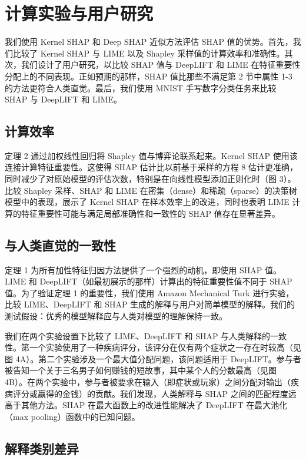 \documentclass[12pt, a4paper]{ctexart} %
\begin{document}
\section{计算实验与用户研究}

我们使用 Kernel SHAP 和 Deep SHAP 近似方法评估 SHAP 值的优势。首先，我们比较了 Kernel SHAP 与 LIME 以及 Shapley 采样值的计算效率和准确性。其次，我们设计了用户研究，以比较 SHAP 值与 DeepLIFT 和 LIME 在特征重要性分配上的不同表现。正如预期的那样，SHAP 值比那些不满足第 2 节中属性 1-3 的方法更符合人类直觉。最后，我们使用 MNIST 手写数字分类任务来比较 SHAP 与 DeepLIFT 和 LIME。

\subsection{计算效率}

定理 2 通过加权线性回归将 Shapley 值与博弈论联系起来。Kernel SHAP 使用该连接计算特征重要性。这使得 SHAP 估计比以前基于采样的方程 8 估计更准确，同时减少了对原始模型的评估次数，特别是在向线性模型添加正则化时（图 3）。比较 Shapley 采样、SHAP 和 LIME 在密集（dense）和稀疏（sparse）的决策树模型中的表现，展示了 Kernel SHAP 在样本效率上的改进，同时也表明 LIME 计算的特征重要性可能与满足局部准确性和一致性的 SHAP 值存在显著差异。

\subsection{与人类直觉的一致性}

定理 1 为所有加性特征归因方法提供了一个强烈的动机，即使用 SHAP 值。LIME 和 DeepLIFT（如最初展示的那样）计算出的特征重要性值不同于 SHAP 值。为了验证定理 1 的重要性，我们使用 Amazon Mechanical Turk 进行实验，比较 LIME、DeepLIFT 和 SHAP 生成的解释与用户对简单模型的解释。我们的测试假设：优秀的模型解释应与人类对模型的理解保持一致。

我们在两个实验设置下比较了 LIME、DeepLIFT 和 SHAP 与人类解释的一致性。第一个实验使用了一种疾病评分，该评分在仅有两个症状之一存在时较高（见图 4A）。第二个实验涉及一个最大值分配问题，该问题适用于 DeepLIFT。参与者被告知一个关于三名男子如何赚钱的短故事，其中某个人的分数最高（见图 4B）。在两个实验中，参与者被要求在输入（即症状或玩家）之间分配对输出（疾病评分或赢得的金钱）的贡献。我们发现，人类解释与 SHAP 之间的匹配程度远高于其他方法。SHAP 在最大函数上的改进性能解决了 DeepLIFT 在最大池化（max pooling）函数中的已知问题。

\subsection{解释类别差异}
\end{document}
